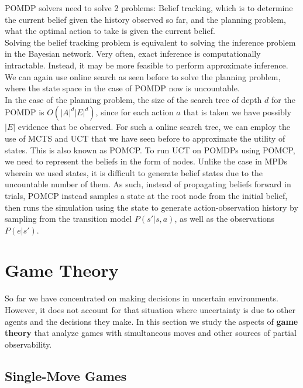 \documentclass[11pt]{article}
\begin{document}
POMDP solvers need to solve 2 problems: Belief tracking, which is to determine the current belief given the history observed so far, and the planning problem, what the optimal action to take is given the current belief.\\

Solving the belief tracking problem is equivalent to solving the inference problem in the Bayesian network. Very often, exact inference is computationally intractable. Instead, it may be more feasible to perform approximate inference.\\

We can again use online search as seen before to solve the planning problem, where the state space in the case of POMDP now is uncountable.\\

In the case of the planning problem, the size of the search tree of depth $d$ for the POMDP is $O(|A|^d|E|^d)$, since for each action $a$ that is taken we have possibly $|E|$ evidence that be observed. For such a online search tree, we can employ the use of MCTS and UCT that we have seen before to approximate the utility of states. This is also known as POMCP. To run UCT on POMDPs using POMCP, we need to represent the beliefs in the form of nodes. Unlike the case in MPDs wherein we used states, it is difficult to generate belief states due to the uncountable number of them. As such, instead of propagating beliefs forward in trials, POMCP instead samples a state at the root node from the initial belief, then runs the simulation using the state to generate action-observation history by sampling from the transition model $P(s'|s, a)$, as well as the observations $P(e|s')$.

\pagebreak
\section{Game Theory}

So far we have concentrated on making decisions in uncertain environments. However, it does not account for that situation where uncertainty is due to other agents and the decisions they make. In this section we study the aspects of \textbf{game theory} that analyze games with simultaneous moves and other sources of partial observability.

\subsection{Single-Move Games}
\end{document}
